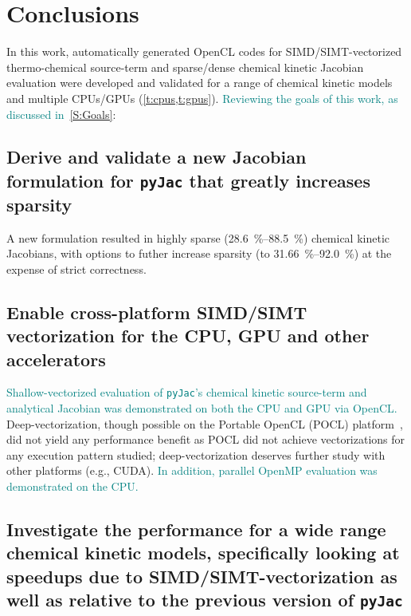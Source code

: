\documentclass[12pt,number,sort&compress,preprint]{elsarticle}
\newcommand{\add}[1]{{\sloppy\textcolor{teal}{#1}}}  %
\begin{document}
\section{Conclusions}
In this work, automatically generated OpenCL codes for SIMD\slash SIMT-vectorized thermo-chemical source-term and sparse\slash dense chemical kinetic Jacobian evaluation were developed and validated for a range of chemical kinetic models~\cite{Burke:2011fh,smith_gri-mech_30,Wang:2007,Sarathy:2013jr} and multiple CPUs\slash GPUs (\cref{t:cpus,t:gpus}).
\add{Reviewing the goals of this work, as discussed in~\cref{S:Goals}}:

\subsection{Derive and validate a new Jacobian formulation for \texttt{pyJac} that greatly increases sparsity}
A new formulation resulted in highly sparse (\SIrange{28.6}{88.5}{\percent}) chemical kinetic Jacobians, with options to futher increase sparsity (to \SIrange{31.66}{92.0}{\percent}) at the expense of strict correctness.

\subsection{Enable cross-platform SIMD\slash SIMT vectorization for the CPU, GPU and other accelerators}
\add{Shallow-vectorized evaluation of \texttt{pyJac}'s chemical kinetic source-term and analytical Jacobian was demonstrated on both the CPU and GPU via OpenCL.}
Deep-vectorization, though possible on the Portable OpenCL (POCL) platform~\cite{poclIJPP}, did not yield any performance benefit as POCL did not achieve vectorizations for any execution pattern studied; deep-vectorization deserves further study with other platforms (e.g., CUDA).
\add{In addition, parallel OpenMP evaluation was demonstrated on the CPU.}

\subsection{Investigate the performance for a wide range chemical kinetic models, specifically looking at speedups due to SIMD\slash SIMT-vectorization as well as relative to the previous version of \texttt{pyJac}}
\end{document}

